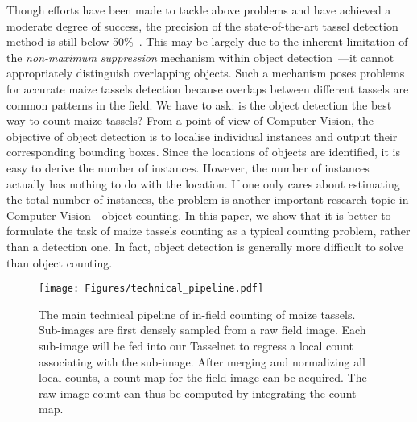 \documentclass[twocolumn]{bmcart}%
\begin{document}
Though efforts have been made to tackle above problems and have achieved a moderate degree of success, the precision of the state-of-the-art tassel detection method is still below 50\%~\cite{lu2015fine}. This may be largely due to the inherent limitation of the \emph{non-maximum suppression} mechanism within object detection~\cite{felzenszwalb2010dpm}---it cannot appropriately distinguish overlapping objects. Such a mechanism poses problems for accurate maize tassels detection because overlaps between different tassels are common patterns in the field. We have to ask: is the object detection the best way to count maize tassels? From a point of view of Computer Vision, the objective of object detection is to localise individual instances and output their corresponding bounding boxes. Since the locations of objects are identified, it is easy to derive the number of instances. However, the number of instances actually has nothing to do with the location. If one only cares about estimating the total number of instances, the problem is another important research topic in Computer Vision---object counting. In this paper, we show that it is better to formulate the task of maize tassels counting as a typical counting problem, rather than a detection one. In fact, object detection is generally more difficult to solve than object counting.

\begin{figure*}[h!]
	\centering
	\texttt{[image: Figures/technical\_pipeline.pdf]}
	\caption{The main technical pipeline of in-field counting of maize tassels. Sub-images are first densely sampled from a raw field image. Each sub-image will be fed into our Tasselnet to regress a local count associating with the sub-image. After merging and normalizing all local counts, a count map for the field image can be acquired. The raw image count can thus be computed by integrating the count map.}
	\label{fig:pipeline}
\end{figure*}
\end{document}
